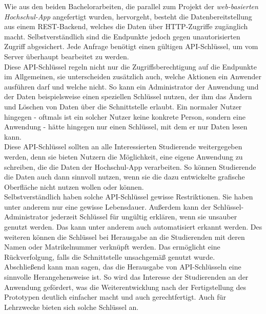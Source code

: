 Wie aus den beiden Bachelorarbeiten, die parallel zum Projekt der \textit{web-basierten Hochschul-\ac{App}} angefertigt wurden, hervorgeht, besteht die Datenbereitstellung aus einem \ac{REST}-Backend, welches die Daten über \ac{HTTP}-Zugriffe zugänglich macht\autocites[][]{dnba}[][]{andreasba}. Selbstverständlich sind die Endpunkte jedoch gegen unautorisierten Zugriff abgesichert. Jede Anfrage benötigt einen gültigen \ac{API}-Schlüssel, um vom Server überhaupt bearbeitet zu werden.\\
\linebreak
Diese \ac{API}-Schlüssel regeln nicht nur die Zugriffsberechtigung auf die Endpunkte im Allgemeinen, sie unterscheiden zusätzlich auch, welche Aktionen ein Anwender ausführen darf und welche nicht. So kann ein Administrator der Anwendung und der Daten beispielsweise einen speziellen Schlüssel nutzen, der ihm das Ändern und Löschen von Daten über die Schnittstelle erlaubt. Ein normaler Nutzer hingegen - oftmals ist ein solcher Nutzer keine konkrete Person, sondern eine Anwendung - hätte hingegen nur einen Schlüssel, mit dem er nur Daten lesen kann.\\
\linebreak
Diese \ac{API}-Schlüssel sollten an alle Interessierten Studierende weitergegeben werden, denn sie bieten Nutzern die Möglichkeit, eine eigene Anwendung zu schreiben, die die Daten der Hochschul-\ac{App} verarbeiten. So können Studierende die Daten auch dann sinnvoll nutzen, wenn sie die dazu entwickelte grafische Oberfläche nicht nutzen wollen oder können.\\
\linebreak
Selbstverständlich haben solche \ac{API}-Schlüssel gewisse Restriktionen. Sie haben unter anderem nur eine gewisse Lebensdauer. Außerdem kann der Schlüssel-Ad\-min\-istrator jederzeit Schlüssel für ungültig erklären, wenn sie unsauber genutzt werden. Das kann unter anderem auch automatisiert erkannt werden. Des weiteren können die Schlüssel bei Herausgabe an die Studierenden mit deren Namen oder Matrikelnummer verknüpft werden. Das ermöglicht eine Rückverfolgung, falls die Schnittstelle unsachgemäß genutzt wurde.\\
\linebreak
Abschließend kann man sagen, das die Herausgabe von \ac{API}-Schlüsseln eine sinnvolle Herangehensweise ist. So wird das Interesse der Studierenden an der Anwendung gefördert, was die Weiterentwicklung nach der Fertigstellung des Prototypen deutlich einfacher macht und auch gerechtfertigt. Auch für Lehrzwecke bieten sich solche Schlüssel an.

